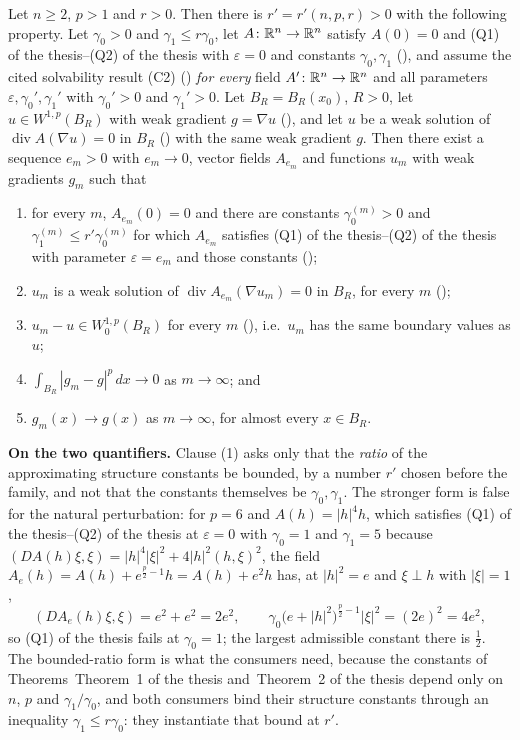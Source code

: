 \begin{helper}
Let $n\ge2$, $p>1$ and $r>0$.  Then there is $r'=r'(n,p,r)>0$ with the following
property.  Let $\gamma_0>0$ and $\gamma_1\le r\gamma_0$, let
$A\colon\mathbb{R}^n\to\mathbb{R}^n$ satisfy $A(0)=0$ and (Q1) of the thesis--(Q2) of the thesis with
$\varepsilon=0$ and constants $\gamma_0,\gamma_1$
(), and assume the cited solvability result (C2)
() \emph{for every} field
$A'\colon\mathbb{R}^n\to\mathbb{R}^n$ and all parameters $\varepsilon,\gamma_0',\gamma_1'$ with
$\gamma_0'>0$ and $\gamma_1'>0$.  Let
$B_R=B_R(x_0)$, $R>0$, let $u\in W^{1,p}(B_R)$ with weak gradient $g=\nabla u$
(), and let $u$
be a weak solution of $\operatorname{div}A(\nabla u)=0$ in $B_R$
() with the same weak gradient $g$.  Then there exist
a sequence $e_m>0$ with $e_m\to0$, vector fields $A_{e_m}$ and functions
$u_m$ with weak gradients $g_m$ such that
\begin{enumerate}
\item for every $m$, $A_{e_m}(0)=0$ and there are constants
  $\gamma_0^{(m)}>0$ and $\gamma_1^{(m)}\le r'\gamma_0^{(m)}$ for which
  $A_{e_m}$ satisfies (Q1) of the thesis--(Q2) of the thesis with parameter
  $\varepsilon=e_m$ and those constants ();
\item $u_m$ is a weak solution of $\operatorname{div}A_{e_m}(\nabla u_m)=0$ in
  $B_R$, for every $m$ ();
\item $u_m-u\in W^{1,p}_0(B_R)$ for every $m$
  (), i.e.\ $u_m$ has the same boundary values as $u$;
\item $\int_{B_R}|g_m-g|^p\,dx\to0$ as $m\to\infty$; and
\item $g_m(x)\to g(x)$ as $m\to\infty$, for almost every $x\in B_R$.
\end{enumerate}

\textbf{On the two quantifiers.}  Clause (1) asks only that the \emph{ratio} of
the approximating structure constants be bounded, by a number $r'$ chosen before
the family, and not that the constants themselves be $\gamma_0,\gamma_1$.  The
stronger form is false for the natural perturbation: for $p=6$ and
$A(h)=|h|^4h$, which satisfies (Q1) of the thesis--(Q2) of the thesis at
$\varepsilon=0$ with $\gamma_0=1$ and $\gamma_1=5$ because
$(D A(h)\xi,\xi)=|h|^4|\xi|^2+4|h|^2(h,\xi)^2$, the field
$A_e(h)=A(h)+e^{\frac p2-1}h=A(h)+e^2h$ has, at $|h|^2=e$ and $\xi\perp h$ with
$|\xi|=1$,
\[
(DA_e(h)\xi,\xi)=e^2+e^2=2e^2,
\qquad
\gamma_0\bigl(e+|h|^2\bigr)^{\frac p2-1}|\xi|^2=(2e)^2=4e^2 ,
\]
so (Q1) of the thesis fails at $\gamma_0=1$; the largest admissible constant there is
$\tfrac12$.  The bounded-ratio form is what the consumers need, because the
constants of Theorems~Theorem~1 of the thesis and~Theorem~2 of the thesis depend only on $n$, $p$ and
$\gamma_1/\gamma_0$, and both consumers bind their structure constants through
an inequality $\gamma_1\le r\gamma_0$: they instantiate that bound at $r'$.


\end{helper}
